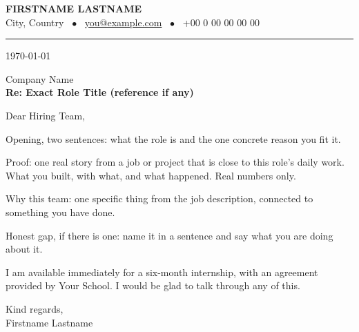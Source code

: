 \documentclass[a4paper,11pt]{article}
\begin{document}
{\fontsize{17}{20}\selectfont\bfseries FIRSTNAME LASTNAME}\\[3pt]
City, Country \ $\bullet$ \ \href{mailto:you@example.com}{you@example.com} \ $\bullet$ \ +00 0 00 00 00 00\\
\rule{\linewidth}{0.4pt}

\today

Company Name\\
\textbf{Re: Exact Role Title (reference if any)}

Dear Hiring Team,

Opening, two sentences: what the role is and the one concrete reason you fit it.

Proof: one real story from a job or project that is close to this role's daily work. What you built, with what, and what happened. Real numbers only.

Why this team: one specific thing from the job description, connected to something you have done.

Honest gap, if there is one: name it in a sentence and say what you are doing about it.

I am available immediately for a six-month internship, with an agreement provided by Your School. I would be glad to talk through any of this.

Kind regards,\\
Firstname Lastname
\end{document}
